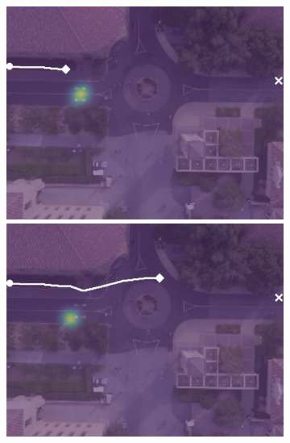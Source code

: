 \documentclass[letterpaper,10pt,conference]{ieeetran}
\begin{document}
\begin{figure}[t!]
\begin{subfigure}[t]{0.48\textwidth}
	\vspace{0.1cm}
	\begin{minipage}[c]{0.47cm}
	\end{minipage}
	\begin{minipage}[c]{0.3\linewidth}
		\includegraphics[width=\linewidth]{./figures/comparison/lstm_1_2_t=100.jpg}
	\end{minipage}
	\begin{minipage}[c]{0.3\linewidth}
		\includegraphics[width=\linewidth]{./figures/comparison/lstm_1_2_t=300.jpg}
	\end{minipage}
	\begin{minipage}[c]{0.3\linewidth}

\end{minipage}
\end{subfigure}
\end{figure}
\end{document}
